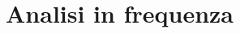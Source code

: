 \documentclass[../main.tex]{subfiles}
\begin{document}
\clearpage
\thispagestyle{empty}
\vspace*{7cm}
\section{Analisi in frequenza}
\vspace*{1.5cm}
\end{document}
